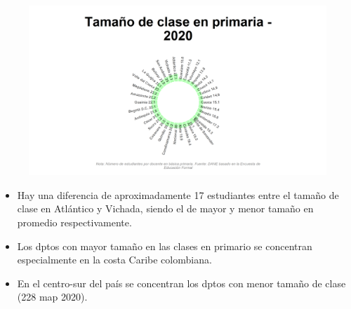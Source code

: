     \begin{figure}[H]
        \caption[Tamaño de clase en primaria por departamentos para 2020 ]{\label{tamano_primaria_dpto_static} }
        \begin{center}
        \includegraphics[width=\textwidth,keepaspectratio]{img/var_228_static.png}
        \end{center}
    \end{figure}
            \begin{itemize}
                \item Hay una diferencia de aproximadamente 17 estudiantes entre el tamaño de clase en Atlántico y Vichada, siendo el de mayor y menor tamaño en promedio respectivamente.
                \item Los dptos con mayor tamaño en las clases en primario se concentran especialmente en la costa Caribe colombiana.
                \item En el centro-sur del país se concentran los dptos con menor tamaño de clase (228 map 2020).
                \end{itemize}

